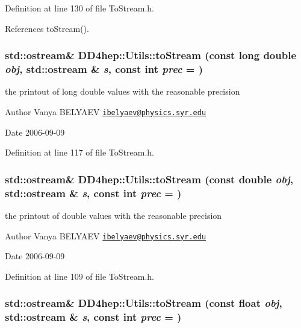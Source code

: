 Definition at line 130 of file ToStream.h.

References toStream().\hypertarget{namespace_d_d4hep_1_1_utils_ac4881c1c93e7105a9f241b2664679409}{
\subsubsection[{toStream}]{\setlength{\rightskip}{0pt plus 5cm}std::ostream\& DD4hep::Utils::toStream (const long double {\em obj}, \/  std::ostream \& {\em s}, \/  const int {\em prec} = {})}}
\label{namespace_d_d4hep_1_1_utils_ac4881c1c93e7105a9f241b2664679409}


the printout of long double values with the reasonable precision \begin{DoxyAuthor}{Author}
Vanya BELYAEV \href{mailto:ibelyaev@physics.syr.edu}{\tt ibelyaev@physics.syr.edu} 
\end{DoxyAuthor}
\begin{DoxyDate}{Date}
2006-\/09-\/09 
\end{DoxyDate}


Definition at line 117 of file ToStream.h.\hypertarget{namespace_d_d4hep_1_1_utils_a63ebaf591a7f6deb9f4f5d9984e3b745}{
\subsubsection[{toStream}]{\setlength{\rightskip}{0pt plus 5cm}std::ostream\& DD4hep::Utils::toStream (const double {\em obj}, \/  std::ostream \& {\em s}, \/  const int {\em prec} = {})}}
\label{namespace_d_d4hep_1_1_utils_a63ebaf591a7f6deb9f4f5d9984e3b745}


the printout of double values with the reasonable precision \begin{DoxyAuthor}{Author}
Vanya BELYAEV \href{mailto:ibelyaev@physics.syr.edu}{\tt ibelyaev@physics.syr.edu} 
\end{DoxyAuthor}
\begin{DoxyDate}{Date}
2006-\/09-\/09 
\end{DoxyDate}


Definition at line 109 of file ToStream.h.\hypertarget{namespace_d_d4hep_1_1_utils_af0a209fec5d19539ace63d69570c70b7}{
\subsubsection[{toStream}]{\setlength{\rightskip}{0pt plus 5cm}std::ostream\& DD4hep::Utils::toStream (const float {\em obj}, \/  std::ostream \& {\em s}, \/  const int {\em prec} = {})}}
\label{namespace_d_d4hep_1_1_utils_af0a209fec5d19539ace63d69570c70b7}


